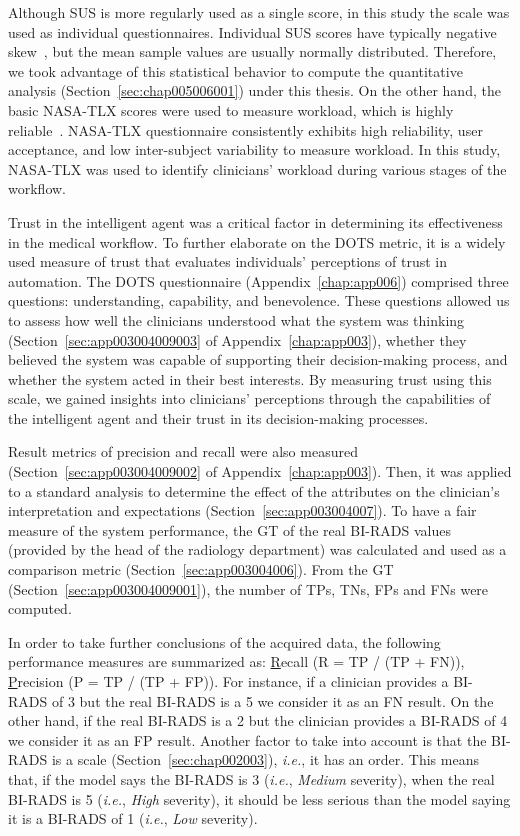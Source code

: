 Although \ac{SUS} is more regularly used as a single score, in this study the scale was used as individual questionnaires.
Individual \ac{SUS} scores have typically negative skew~\cite{10.1145/3399715.3399744}, but the mean sample values are usually normally distributed.
Therefore, we took advantage of this statistical behavior to compute the quantitative analysis (Section~\ref{sec:chap005006001}) under this thesis.
On the other hand, the basic \ac{NASA-TLX} scores were used to measure workload, which is highly reliable~\cite{10.1145/3399715.3399744}.
\ac{NASA-TLX} questionnaire consistently exhibits high reliability, user acceptance, and low inter-subject variability to measure workload.
In this study, \ac{NASA-TLX} was used to identify clinicians' workload during various stages of the workflow.

Trust in the intelligent agent was a critical factor in determining its effectiveness in the medical workflow.
To further elaborate on the \ac{DOTS} metric, it is a widely used measure of trust that evaluates individuals' perceptions of trust in automation.
The \ac{DOTS} questionnaire (Appendix~\ref{chap:app006}) comprised three questions: understanding, capability, and benevolence.
These questions allowed us to assess how well the clinicians understood what the system was thinking (Section~\ref{sec:app003004009003} of Appendix~\ref{chap:app003}), whether they believed the system was capable of supporting their decision-making process, and whether the system acted in their best interests.
By measuring trust using this scale, we gained insights into clinicians' perceptions through the capabilities of the intelligent agent and their trust in its decision-making processes.

Result metrics of precision and recall were also measured (Section~\ref{sec:app003004009002} of Appendix~\ref{chap:app003}).
Then, it was applied to a standard analysis to determine the effect of the attributes on the clinician's interpretation and expectations (Section~\ref{sec:app003004007}).
To have a fair measure of the system performance, the \ac{GT} of the real \ac{BI-RADS} values (provided by the head of the radiology department) was calculated and used as a comparison metric (Section~\ref{sec:app003004006}).
From the \ac{GT} (Section~\ref{sec:app003004009001}), the number of \acfp{TP}, \acfp{TN}, \acfp{FP} and \acfp{FN} were computed.

In order to take further conclusions of the acquired data, the following performance measures are summarized as: \underline{R}ecall (R = \ac{TP} / (\ac{TP} + \ac{FN})), \underline{P}recision (P = \ac{TP} / (\ac{TP} + \ac{FP})).
For instance, if a clinician provides a \ac{BI-RADS} of 3 but the real \ac{BI-RADS} is a 5 we consider it as an \ac{FN} result.
On the other hand, if the real \ac{BI-RADS} is a 2 but the clinician provides a \ac{BI-RADS} of 4 we consider it as an \ac{FP} result.
Another factor to take into account is that the \ac{BI-RADS} is a scale (Section~\ref{sec:chap002003}), {\it i.e.}, it has an order.
This means that, if the model says the \ac{BI-RADS} is 3 ({\it i.e.}, {\it Medium} severity), when the real \ac{BI-RADS} is 5 ({\it i.e.}, {\it High} severity), it should be less serious than the model saying it is a \ac{BI-RADS} of 1 ({\it i.e.}, {\it Low} severity).


